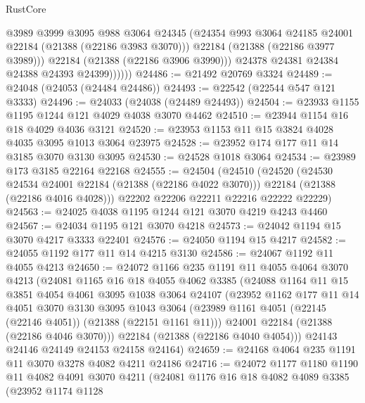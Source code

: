 \begin{lexlean}{RustCore}
\begin{coremodule}
                    @3989
                    @3999
                    @3095
                    @988
                    @3064
                    @24345
                    (@24354 @993 @3064 @24185 @24001 @22184 (@21388 (@22186 @3983 @3070)))
                    @22184
                    (@21388 (@22186 @3977 @3989)))
                  @22184
                  (@21388 (@22186 @3906 @3990)))
                @24378
                @24381
                @24384
                @24388
                @24393
                @24399))))))
@24486 := @21492 @20769 @3324
@24489 := @24048 (@24053 (@24484 @24486))
@24493 := @22542 (@22544 @547 @121 @3333)
@24496 := @24033 (@24038 (@24489 @24493))
@24504 := @23933 @1155 @1195 @1244 @121 @4029 @4038 @3070 @4462
@24510 := @23944 @1154 @16 @18 @4029 @4036 @3121
@24520 := @23953 @1153 @11 @15 @3824 @4028 @4035 @3095 @1013 @3064 @23975
@24528 := @23952 @174 @177 @11 @14 @3185 @3070 @3130 @3095
@24530 := @24528 @1018 @3064
@24534 := @23989 @173 @3185 @22164 @22168
@24555 := @24504
    (@24510
      (@24520
        (@24530 @24534 @24001 @22184 (@21388 (@22186 @4022 @3070)))
        @22184
        (@21388 (@22186 @4016 @4028)))
      @22202
      @22206
      @22211
      @22216
      @22222
      @22229)
@24563 := @24025 @4038 @1195 @1244 @121 @3070 @4219 @4243 @4460
@24567 := @24034 @1195 @121 @3070 @4218
@24573 := @24042 @1194 @15 @3070 @4217 @3333 @22401
@24576 := @24050 @1194 @15 @4217
@24582 := @24055 @1192 @177 @11 @14 @4215 @3130
@24586 := @24067 @1192 @11 @4055 @4213
@24650 := @24072
    @1166
    @235
    @1191
    @11
    @4055
    @4064
    @3070
    @4213
    (@24081
      @1165
      @16
      @18
      @4055
      @4062
      @3385
      (@24088
        @1164
        @11
        @15
        @3851
        @4054
        @4061
        @3095
        @1038
        @3064
        @24107
        (@23952
          @1162
          @177
          @11
          @14
          @4051
          @3070
          @3130
          @3095
          @1043
          @3064
          (@23989 @1161 @4051 (@22145 (@22146 @4051)) (@21388 (@22151 @1161 @11)))
          @24001
          @22184
          (@21388 (@22186 @4046 @3070)))
        @22184
        (@21388 (@22186 @4040 @4054)))
      @24143
      @24146
      @24149
      @24153
      @24158
      @24164)
@24659 := @24168 @4064 @235 @1191 @11 @3070 @3278 @4082 @4211 @24186
@24716 := @24072
    @1177
    @1180
    @1190
    @11
    @4082
    @4091
    @3070
    @4211
    (@24081
      @1176
      @16
      @18
      @4082
      @4089
      @3385
      (@23952
        @1174
        @1128

\end{coremodule}
\end{lexlean}
